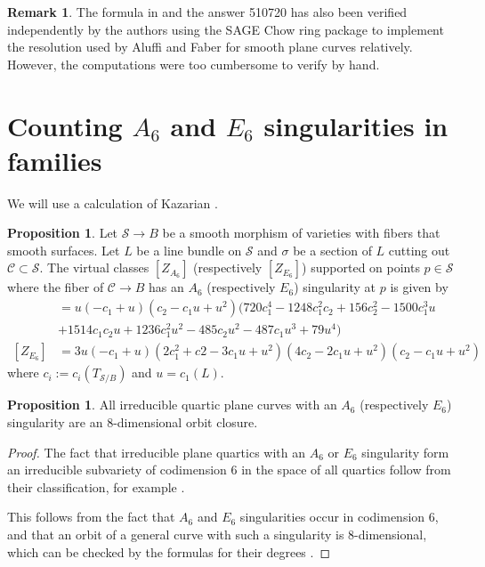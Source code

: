 \documentclass{article}
\newcommand{\rood}[1]{\textcolor{red}{[#1]}}
\theoremstyle{definition}
\newtheorem{prop}[thm]{Proposition}
\newtheorem{rmk}[thm]{Remark}
\newcommand{\mc}{\mathcal}
\begin{document}
\begin{rmk}
The formula in  and the answer 510720 has also been verified independently by the authors using the SAGE Chow ring package \cite{ChowRing} to implement the resolution used by Aluffi and Faber \cite{AF93} for smooth plane curves relatively. However, the computations were too cumbersome to verify by hand. \end{rmk}
\section{Counting $A_6$ and $E_6$ singularities in families}
\label{stratasection}
We will use a calculation of Kazarian \cite[Theorem 1]{Kazarian}. 
\begin{prop}
\label{Kaztheman}
Let $\mc{S}\to B$ be a smooth morphism of varieties with fibers that smooth surfaces. Let $L$ be a line bundle on $\mc{S}$ and $\sigma$ be a section of $L$ cutting out $\mc{C}\subset \mc{S}$. The virtual classes $[Z_{A_6}]$ (respectively $[Z_{E_6}]$) supported on points $p\in \mc{S}$ where the fiber of $\mc{C}\to B$ has an $A_6$ (respectively $E_6$) singularity at $p$ is given by
\begin{align*}
[Z_{A_6}]&=u (-c_1 + u) (c_2 - c_1 u + u^2) (720 c_1^4 - 1248 c_1^2 c_2 + 156 c_2^2 - 
   1500 c_1^3 u\\& + 1514 c_1 c_2 u+ 1236 c_1^2 u^2 - 485 c_2 u^2 - 
   487 c_1 u^3 + 79 u^4)\\
[Z_{E_6}] &= 3 u (-c_1 + u) (2 c_1^2 + c2 - 3 c_1 u + u^2)(4 c_2 - 2 c_1 u + u^2) (c_2 -
    c_1 u + u^2)
   \end{align*}
 where $c_i:=c_i(T_{\mc{S}/B})$ and $u=c_1(L)$. 
\end{prop}


\begin{prop}
\label{oneorbit}
All irreducible quartic plane curves with an $A_6$ (respectively $E_6$) singularity are an 8-dimensional orbit closure.
\end{prop}
\begin{proof}
The fact that irreducible plane quartics with an $A_6$ or $E_6$ singularity form an irreducible subvariety of codimension 6 in the space of all quartics follow from their classification, for example \cite[Section 3.4]{Nejad2}. %

This follows from the fact that $A_6$ and $E_6$ singularities occur in codimension 6, and that an orbit of a general curve with such a singularity is 8-dimensional, which can be checked by the formulas for their degrees \cite[Examples 5.2 and 5.4]{AF00}.
\end{proof}
\end{document}
